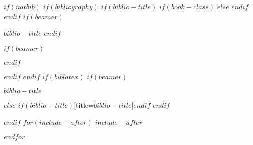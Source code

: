 \documentclass[
$if(fontsize)$
$fontsize$,
$endif$
$if(lang)$
$babel-lang$,
$endif$
$if(papersize)$
$papersize$paper,
$else$
a4paper,
$endif$
$if(beamer)$
ignorenonframetext,
$if(handout)$
handout,
$endif$
$if(aspectratio)$
aspectratio=$aspectratio$,
$endif$
$endif$
$for(classoption)$
$classoption$$sep$,
$endfor$
,tablecaptionabove
]{$if(documentclass)$$documentclass$$else$scrartcl$endif$}
\newif\ifbibliography
\begin{document}
$if(natbib)$
$if(bibliography)$
$if(biblio-title)$
$if(book-class)$
\renewcommand\bibname{$biblio-title$}
$else$
\renewcommand\refname{$biblio-title$}
$endif$
$endif$
$if(beamer)$
\begin{frame}[allowframebreaks]{$biblio-title$}
\bibliographytrue
$endif$

$if(beamer)$
\end{frame}
$endif$

$endif$
$endif$
$if(biblatex)$
$if(beamer)$
\begin{frame}[allowframebreaks]{$biblio-title$}
\bibliographytrue
\printbibliography[heading=none]
\end{frame}
$else$
\printbibliography$if(biblio-title)$[title=$biblio-title$]$endif$
$endif$

$endif$
$for(include-after)$
$include-after$

$endfor$
\end{document}
